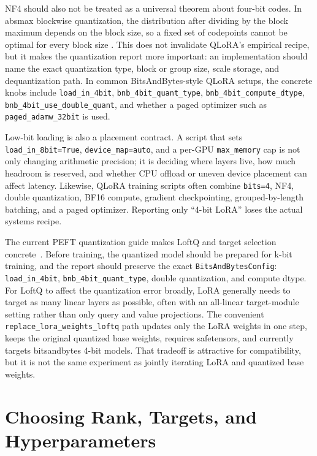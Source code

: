 NF4 should also not be treated as a universal theorem about four-bit codes. In absmax blockwise quantization, the distribution after dividing by the block maximum depends on the block size, so a fixed set of codepoints cannot be optimal for every block size \cite{yoshida2023nf4}. This does not invalidate QLoRA's empirical recipe, but it makes the quantization report more important: an implementation should name the exact quantization type, block or group size, scale storage, and dequantization path. In common BitsAndBytes-style QLoRA setups, the concrete knobs include \texttt{load\_in\_4bit}, \texttt{bnb\_4bit\_quant\_type}, \texttt{bnb\_4bit\_compute\_dtype}, \texttt{bnb\_4bit\_use\_double\_quant}, and whether a paged optimizer such as \texttt{paged\_adamw\_32bit} is used.

Low-bit loading is also a placement contract. A script that sets \texttt{load\_in\_8bit=True}, \texttt{device\_map=auto}, and a per-GPU \texttt{max\_memory} cap is not only changing arithmetic precision; it is deciding where layers live, how much headroom is reserved, and whether CPU offload or uneven device placement can affect latency. Likewise, QLoRA training scripts often combine \texttt{bits=4}, NF4, double quantization, BF16 compute, gradient checkpointing, grouped-by-length batching, and a paged optimizer. Reporting only ``4-bit LoRA'' loses the actual systems recipe.

The current PEFT quantization guide makes LoftQ and target selection concrete~\cite{huggingface2026peftquantization}. Before training, the quantized model should be prepared for k-bit training, and the report should preserve the exact \texttt{BitsAndBytesConfig}: \texttt{load\_in\_4bit}, \texttt{bnb\_4bit\_quant\_type}, double quantization, and compute dtype. For LoftQ to affect the quantization error broadly, LoRA generally needs to target as many linear layers as possible, often with an all-linear target-module setting rather than only query and value projections. The convenient \texttt{replace\_lora\_weights\_loftq} path updates only the LoRA weights in one step, keeps the original quantized base weights, requires safetensors, and currently targets bitsandbytes 4-bit models. That tradeoff is attractive for compatibility, but it is not the same experiment as jointly iterating LoRA and quantized base weights.

\section{Choosing Rank, Targets, and Hyperparameters}
\label{sec:rank-target-hyperparameters}

